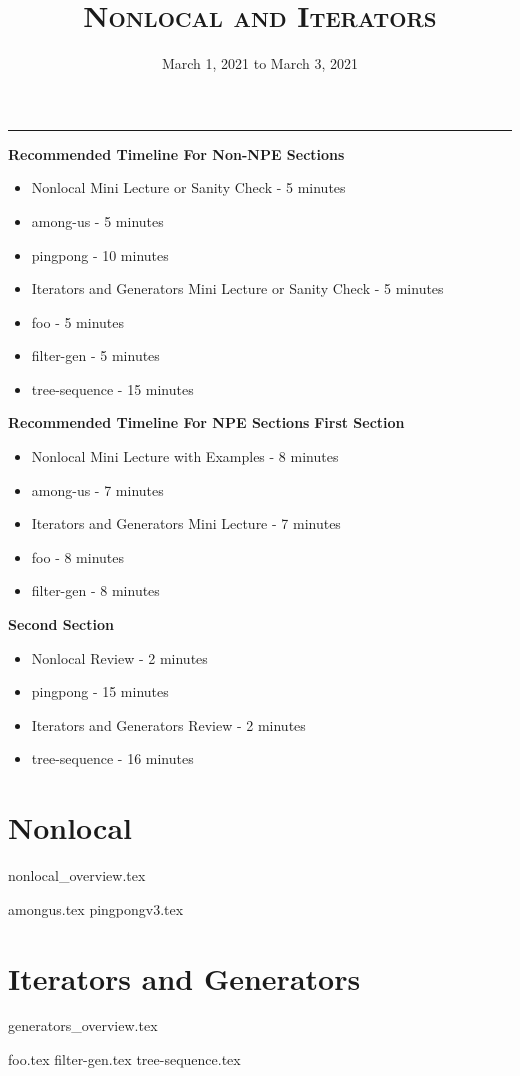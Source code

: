 \documentclass{exam}
\title{\textsc{Nonlocal and Iterators}}
\date{March 1, 2021 to March 3, 2021}
\begin{document}
	\maketitle
	\rule{\textwidth}{0.15em}
	\fontsize{12}{15}\selectfont
	
\begin{guide}
	\textbf{Recommended Timeline For Non-NPE Sections}
	\begin{itemize}
		\item Nonlocal Mini Lecture or Sanity Check - 5 minutes
		\item among-us - 5 minutes
		\item pingpong - 10 minutes
		\item Iterators and Generators Mini Lecture or Sanity Check - 5 minutes
		\item foo - 5 minutes
		\item filter-gen - 5 minutes
		\item tree-sequence - 15 minutes
	\end{itemize}
	\textbf{Recommended Timeline For NPE Sections}
	\textbf{First Section}
	\begin{itemize}
		\item Nonlocal Mini Lecture with Examples - 8 minutes
		\item among-us - 7 minutes
		\item Iterators and Generators Mini Lecture - 7 minutes
		\item foo - 8 minutes
		\item filter-gen - 8 minutes
	\end{itemize}
	\textbf{Second Section}
	\begin{itemize}
		\item Nonlocal Review - 2 minutes
		\item pingpong - 15 minutes
		\item Iterators and Generators Review - 2 minutes
		\item tree-sequence - 16 minutes
	\end{itemize}
\end{guide}

\section{Nonlocal}
{nonlocal_overview.tex}
\begin{questions}
	{amongus.tex}
	{pingpongv3.tex}
\end{questions}
\vspace{-4em}
\section{Iterators and Generators}
{generators_overview.tex}
\begin{questions}
	{foo.tex}
	{filter-gen.tex}
	{tree-sequence.tex}
\end{questions}
\end{document}
